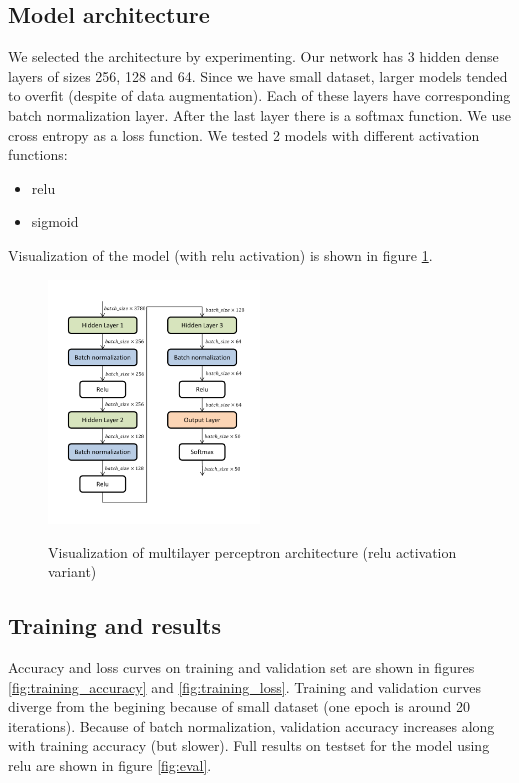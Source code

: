 \documentclass[a4paper]{article}
\begin{document}
\begin{multicols}{2}
\subsection{Model architecture}
We selected the architecture by experimenting.
Our network has 3 hidden dense layers of sizes 256, 128 and 64.
Since we have small dataset, larger models tended to overfit
(despite of data augmentation).
Each of these layers have corresponding batch normalization layer.
After the last layer there is a softmax function.
We use cross entropy as a loss function.
We tested 2 models with different activation functions:
\begin{itemize}
    \item relu
    \item sigmoid
\end{itemize}

Visualization of the model (with relu activation) is shown in figure \ref{fig:arch}.

\begin{figure}[H]
    \caption[]{Visualization of multilayer perceptron architecture (relu activation variant)}
    \centering
    \includegraphics[page=1,width=0.5\textwidth]{architecture.pdf}
    \label{fig:arch}
\end{figure}


\subsection{Training and results}
Accuracy and loss curves on training and validation set are shown in figures \ref{fig:training_accuracy} and \ref{fig:training_loss}.
Training and validation curves diverge from the begining because of small dataset (one epoch is around 20 iterations).
Because of batch normalization, validation accuracy increases along with training accuracy (but slower).
Full results on testset for the model using relu are shown in figure \ref{fig:eval}.


\end{multicols}
\end{document}
